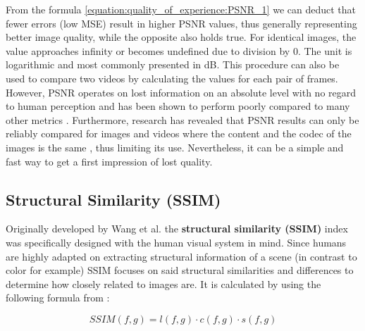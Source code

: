 From the formula \ref{equation:quality_of_experience:PSNR_1} we can deduct that fewer errors (low MSE) result in higher PSNR values, thus generally representing better image quality, while the opposite also holds true. For identical images, the value approaches infinity or becomes undefined due to division by 0. The unit is logarithmic and most commonly presented in dB. This procedure can also be used to compare two videos by calculating the values for each pair of frames. However, PSNR operates on lost information on an absolute level with no regard to human perception and has been shown to perform poorly compared to many other metrics \cite{HuGh08} \cite{HuGh12}. Furthermore, research has revealed that PSNR results can only be reliably compared for images and videos where the content and the codec of the images is the same \cite{HuGh08}, thus limiting its use. Nevertheless, it can be a simple and fast way to get a first impression of lost quality.



\subsection{Structural Similarity (SSIM)}
Originally developed by Wang et al.\cite{WBSS04} the \textbf{structural similarity (SSIM)} index was specifically designed with the human visual system in mind. Since humans are highly adapted on extracting structural information of a scene (in contrast to color for example) SSIM focuses on said structural similarities and differences to determine how closely related to images are. It is calculated by using the following formula from \cite{HoZi10}:

\begin{equation}
SSIM(f,g) = l(f,g) \cdot c(f,g) \cdot s(f,g)
\label{equation:quality_of_experience:SSIM_1}
\end{equation}

